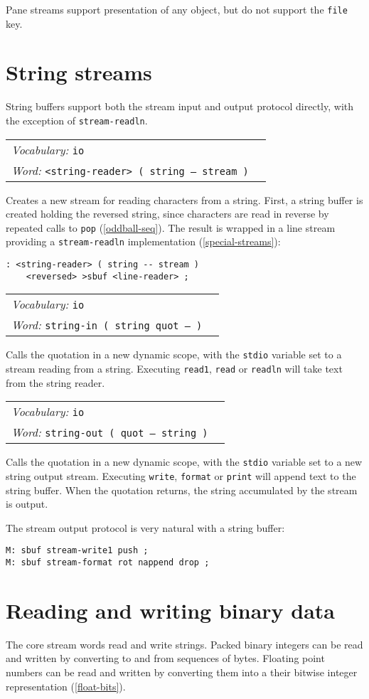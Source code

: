\documentclass{book}
\newcommand{\vocabulary}[1]{\emph{Vocabulary:} \texttt{#1}&\\}
\newcommand{\ordinaryword}[2]{\index{\texttt{#1}}\emph{Word:} \texttt{#2}&\\}
\newcommand{\wordtable}[1]{


\begin{tabularx}{12cm}{lX}
\hline
#1
\hline
\end{tabularx}

}
\begin{document}
Pane streams support presentation of any object, but do not support the \verb|file| key.

\section{String streams}\label{string-streams}

String buffers support both the stream input and output protocol directly, with the exception of \verb|stream-readln|.

\wordtable{
\vocabulary{io}
\ordinaryword{<string-reader>}{<string-reader> ( string -- stream )}
}
Creates a new stream for reading characters from a string. First, a string buffer is created holding the reversed string, since characters are read in reverse by repeated calls to \verb|pop| (\ref{oddball-seq}). The result is wrapped in a line stream providing a \verb|stream-readln| implementation (\ref{special-streams}):
\begin{verbatim}
: <string-reader> ( string -- stream )
    <reversed> >sbuf <line-reader> ;
\end{verbatim}

\wordtable{
\vocabulary{io}
\ordinaryword{string-in}{string-in ( string quot -- )}
}
Calls the quotation in a new dynamic scope, with the \texttt{stdio} variable set to a stream reading from a string. Executing \texttt{read1}, \texttt{read} or \texttt{readln} will take text from the string reader.

\wordtable{
\vocabulary{io}
\ordinaryword{string-out}{string-out ( quot -- string )}
}
Calls the quotation in a new dynamic scope, with the \texttt{stdio} variable set to a new string output stream. Executing \texttt{write}, \texttt{format} or \texttt{print} will append text to the string buffer. When the quotation returns, the string accumulated by the stream is output.

The stream output protocol is very natural with a string buffer:
\begin{verbatim}
M: sbuf stream-write1 push ;
M: sbuf stream-format rot nappend drop ;
\end{verbatim}

\section{Reading and writing binary data}

The core stream words read and write strings. Packed binary integers can be read and written by converting to and from sequences of bytes. Floating point numbers can be read and written by converting them into a their bitwise integer representation (\ref{float-bits}).
\end{document}
